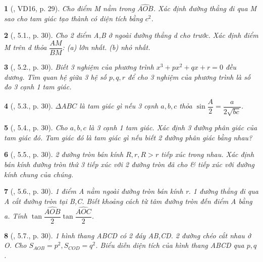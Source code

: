 \documentclass{article}
\newtheorem{baitoan}{}
\begin{document}
\begin{baitoan}[\cite{Hai_Hung_Thu_Tung2022_tap_1}, VD16, p. 29]
	Cho điểm M nằm trong $\widehat{AOB}$. Xác định đường thẳng đi qua M sao cho tam giác tạo thành có diện tích bằng $c^2$.
\end{baitoan}

\begin{baitoan}[\cite{Hai_Hung_Thu_Tung2022_tap_1}, 5.1., p. 30]
	Cho 2 điểm A,B ở ngoài đường thẳng d cho trước. Xác định điểm M trên d thỏa $\dfrac{AM}{BM}$: (a) lớn nhất. (b) nhỏ nhất.
\end{baitoan}

\begin{baitoan}[\cite{Hai_Hung_Thu_Tung2022_tap_1}, 5.2., p. 30]
	Biết 3 nghiệm của phương trình $x^3 + px^2 + qx + r = 0$ đều dương. Tìm quan hệ giữa 3 hệ số $p,q,r$ để cho 3 nghiệm của phương trình là số đo 3 cạnh 1 tam giác.
\end{baitoan}

\begin{baitoan}[\cite{Hai_Hung_Thu_Tung2022_tap_1}, 5.3., p. 30]
	$\Delta ABC$ là tam giác gì nếu 3 cạnh $a,b,c$ thỏa $\sin\dfrac{A}{2} = \dfrac{a}{2\sqrt{bc}}$.
\end{baitoan}

\begin{baitoan}[\cite{Hai_Hung_Thu_Tung2022_tap_1}, 5.4., p. 30]
	Cho $a,b,c$ là 3 cạnh 1 tam giác. Xác định 3 đường phân giác của tam giác đó. Tam giác đó là tam giác gì nếu biết 2 đường phân giác bằng nhau?
\end{baitoan}

\begin{baitoan}[\cite{Hai_Hung_Thu_Tung2022_tap_1}, 5.5., p. 30]
	2 đường tròn bán kính $R,r,R > r$ tiếp xúc trong nhau. Xác định bán kính đường tròn thứ 3 tiếp xúc với 2 đường tròn đã cho \& tiếp xúc với đường kính chung của chúng.
\end{baitoan}

\begin{baitoan}[\cite{Hai_Hung_Thu_Tung2022_tap_1}, 5.6., p. 30]
	1 điểm A nằm ngoài đường tròn bán kính r. 1 đường thẳng đi qua A cắt đường tròn tại B,C. Biết khoảng cách từ tâm đường tròn đến điểm A bằng a. Tính $\tan\dfrac{\widehat{AOB}}{2}\tan\dfrac{\widehat{AOC}}{2}$.
\end{baitoan}

\begin{baitoan}[\cite{Hai_Hung_Thu_Tung2022_tap_1}, 5.7., p. 30]
	1 hình thang ABCD có 2 đáy AB,CD. 2 đường chéo cắt nhau ở O. Cho $S_{AOB} = p^2,S_{COD} = q^2$. Biểu diễn diện tích của hình thang ABCD qua $p,q$.
\end{baitoan}
\end{document}
